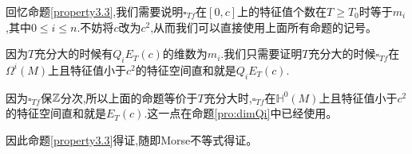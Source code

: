 回忆命题\ref{property3.3},我们需要说明$\square_{Tf}$在$[0,c]$上的特征值个数在$T\geq T_0$时等于$m_i$,其中$0\leq i \leq n$.不妨将$c$改为$c^2$,从而我们可以直接使用上面所有命题的记号。

因为$T$充分大的时候有$Q_iE_T(c)$的维数为$m_i$.我们只需要证明$T$充分大的时候$\square_{Tf}$在$\Omega^i(M)$上且特征值小于$c^2$的特征空间直和就是$Q_iE_T(c)$.

因为$\square_{Tf}$保$\mathbb{Z}$分次,所以上面的命题等价于$T$充分大时,$\square_{Tf}$在$\mathbb{H}^0(M)$上且特征值小于$c^2$的特征空间直和就是$E_T(c)$.这一点在命题\ref{pro:dimQi}中已经使用。

因此命题\ref{property3.3}得证,随即Morse不等式得证。
